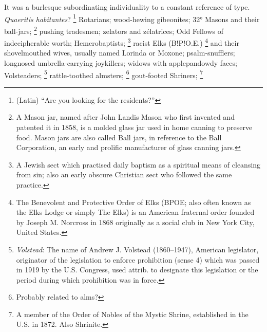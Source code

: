   It was a burlesque 
subordinating individuality to a constant reference of type. 
\textit{Quaeritis habitantes}?
\footnote{ (Latin) “Are you looking for the residents?”}
Rotarians; 
wood-hewing gibeonites; 
32° Masons and their ball-jars; 
\footnote{ A Mason jar, named after John Landis Mason who first invented and
patented it in 1858, is a molded glass jar used in home canning to preserve
food. Mason jars are also called Ball jars, in reference to the Ball
Corporation, an early and prolific manufacturer of glass canning jars.
}
pushing tradesmen; zelators and zélatrices; 
Odd Fellows of indecipherable worth; Hemerobaptists; 
\footnote{ A Jewish sect which practised daily baptism as a spiritual means of
cleansing from sin; also an early obscure Christian sect who followed the same
practice. 
}
racist Elks (B!P!O.E.) 
\footnote{The Benevolent and Protective Order of Elks (BPOE; also often known as
  the Elks Lodge or simply The Elks) is an American fraternal order founded by
  Joseph M. Norcross in 1868 originally as a social club in New York City, 
  United States.}
and their shovelmouthed wives, usually named Lorinda or Moxone; psalm-snufflers; 
longnosed umbrella-carrying joykillers; widows with applepandowdy 
faces; Volsteaders;
\footnote{ \textit{Volstead}: The name of Andrew J. Volstead (1860–1947),
American legislator, originator of the legislation to enforce prohibition (sense
4) which was passed in 1919 by the U.S. Congress, used attrib. to designate this
legislation or the period during which prohibition was in force. 
}
rattle-toothed almsters; 
\footnote{ \textdbend Probably related to alms?}
gout-footed Shriners; 
\footnote{ A member of the Order of Nobles of the Mystic Shrine, established in
  the U.S. in 1872. Also Shrinite. }
